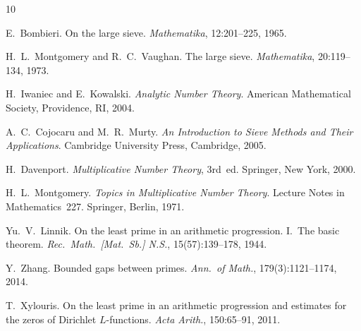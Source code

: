 \documentclass[12pt,a4paper]{amsart}
\theoremstyle{definition}
\begin{document}
\begin{thebibliography}{10}

E.~Bombieri.
\newblock On the large sieve.
\newblock \emph{Mathematika}, 12:201--225, 1965.

H.~L.~Montgomery and R.~C.~Vaughan.
\newblock The large sieve.
\newblock \emph{Mathematika}, 20:119--134, 1973.

H.~Iwaniec and E.~Kowalski.
\newblock \emph{Analytic Number Theory}.
\newblock American Mathematical Society, Providence, RI, 2004.

A.~C.~Cojocaru and M.~R.~Murty.
\newblock \emph{An Introduction to Sieve Methods and Their Applications}.
\newblock Cambridge University Press, Cambridge, 2005.

H.~Davenport.
\newblock \emph{Multiplicative Number Theory}, 3rd~ed.
\newblock Springer, New York, 2000.

H.~L.~Montgomery.
\newblock \emph{Topics in Multiplicative Number Theory}.
\newblock Lecture Notes in Mathematics~227. Springer, Berlin, 1971.

Yu.~V.~Linnik.
\newblock On the least prime in an arithmetic progression.
  I.~The basic theorem.
\newblock \emph{Rec.\ Math.\ [Mat.\ Sb.] N.S.}, 15(57):139--178, 1944.

Y.~Zhang.
\newblock Bounded gaps between primes.
\newblock \emph{Ann.\ of Math.}, 179(3):1121--1174, 2014.

T.~Xylouris.
\newblock On the least prime in an arithmetic progression and estimates for
  the zeros of Dirichlet $L$-functions.
\newblock \emph{Acta Arith.}, 150:65--91, 2011.

\end{thebibliography}
\end{document}
